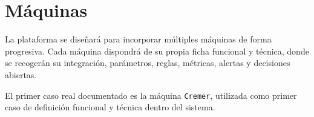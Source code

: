 \section{Máquinas}

La plataforma se diseñará para incorporar múltiples máquinas de forma progresiva. Cada máquina dispondrá de su propia ficha funcional y técnica, donde se recogerán su integración, parámetros, reglas, métricas, alertas y decisiones abiertas.

El primer caso real documentado es la máquina \texttt{Cremer}, utilizada como primer caso de definición funcional y técnica dentro del sistema.

